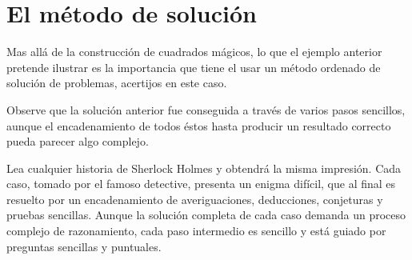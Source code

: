 \section{El método de solución}

\label{sec:metodosolucion} 

Mas allá de la construcción de cuadrados mágicos, lo que el ejemplo
anterior pretende ilustrar es la importancia que tiene el usar un
método ordenado de solución de problemas, acertijos en este caso.

Observe que la solución anterior fue conseguida a través de varios
pasos sencillos, aunque el encadenamiento de todos éstos hasta producir
un resultado correcto pueda parecer algo complejo.

Lea cualquier historia de Sherlock Holmes y obtendrá la misma impresión.
Cada caso, tomado por el famoso detective, presenta un enigma difícil,
que al final es resuelto por un encadenamiento de averiguaciones,
deducciones, conjeturas y pruebas sencillas. Aunque la solución completa
de cada caso demanda un proceso complejo de razonamiento, cada paso
intermedio es sencillo y está guiado por preguntas sencillas y puntuales.

